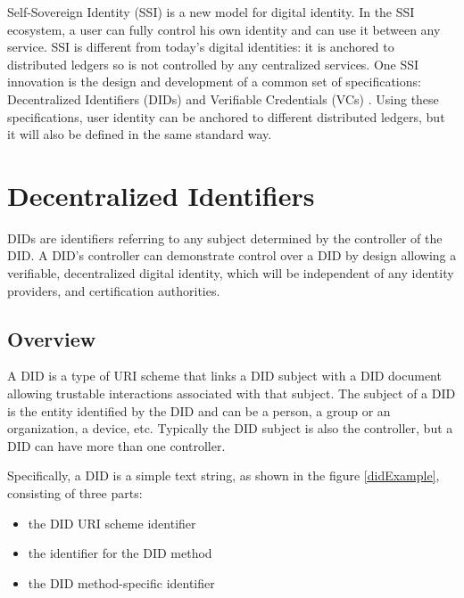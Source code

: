 
Self-Sovereign Identity (SSI) \cite{tobin2016inevitable} is a new model for digital identity. In the SSI ecosystem, a user can fully control his own identity and can use it between any service. SSI is different from today's digital identities: it is anchored to distributed ledgers so is not controlled by any centralized services.
One SSI innovation is the design and development of a common set of specifications: 
Decentralized Identifiers (DIDs) \cite{didW3C} and Verifiable Credentials (VCs) \cite{vcW3C}. Using these specifications, user identity can be anchored to different distributed ledgers, but it will also be defined in the same standard way.

\section{Decentralized Identifiers}  
DIDs \cite{didW3C} are identifiers referring to any subject determined by the controller of the DID.
A DID's controller can demonstrate control over a DID by design allowing a verifiable, decentralized digital identity, which will be independent of any identity providers, and certification authorities.

\subsection*{Overview}

A DID is a type of URI \cite{berners2005uniform} scheme that links a DID subject with a DID document allowing trustable interactions associated with that subject. The subject of a DID is the entity identified by the DID and can be a person, a group or an organization, a device, etc. Typically the DID subject is also the controller, but a DID can have more than one controller. 

Specifically, a DID is a simple text string, as shown in the figure \ref{didExample}, consisting of three parts: 
\begin{itemize}
    \item the DID URI scheme identifier
    \item the identifier for the DID method
    \item the DID method-specific identifier
\end{itemize}

